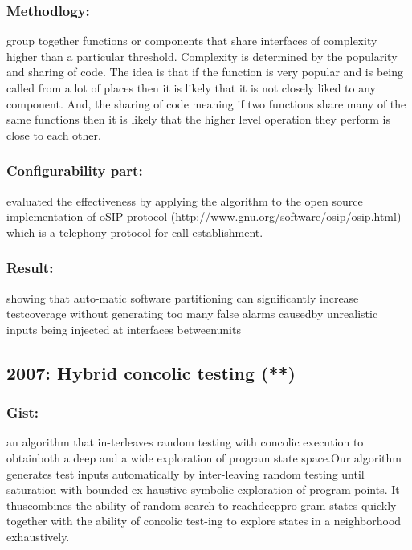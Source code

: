 \documentclass[	runningheads,
				a4paper]{llncs}
\begin{document}
\subsubsection{Methodlogy:}
group together functions or components that share interfaces of complexity higher than 
a particular threshold. Complexity is determined by the popularity and sharing of code. The idea is that 
if the function is very popular and is being called from a lot of places then it is likely that it is not closely liked to any component. 
And, the sharing of code meaning if two functions share many of the same functions then it is likely that the higher level operation they perform is close to each other.

\subsubsection{Configurability part:}
evaluated the effectiveness by applying the algorithm to the open source implementation of oSIP protocol (http://www.gnu.org/software/osip/osip.html) which is a telephony protocol for call establishment. 


\subsubsection{Result:}
showing  that  auto-matic  software  partitioning  can  significantly  increase  testcoverage without generating too many false alarms causedby unrealistic inputs being injected at interfaces betweenunits

\subsection{2007: Hybrid concolic testing (**)}

\subsubsection{Gist:}
an algorithm that in-terleaves random testing with concolic execution to obtainboth a deep and a wide exploration of program state space.Our algorithm generates test inputs automatically by inter-leaving  random  testing  until  saturation  with  bounded  ex-haustive  symbolic  exploration  of  program  points.   It  thuscombines the ability of random search to reachdeeppro-gram states quickly together with the ability of concolic test-ing to explore states in a neighborhood exhaustively. 
\end{document}
